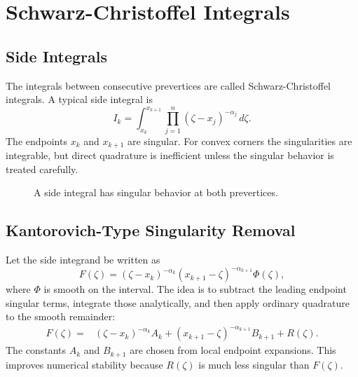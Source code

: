 \documentclass[12pt,a4paper]{article}
\begin{document}
\section{Schwarz-Christoffel Integrals}

\subsection{Side Integrals}

The integrals between consecutive prevertices are called Schwarz-Christoffel integrals. A typical side integral is
\[
I_k=\int_{x_k}^{x_{k+1}}\prod_{j=1}^{n}(\zeta-x_j)^{-\alpha_j}\,d\zeta.
\]
The endpoints \(x_k\) and \(x_{k+1}\) are singular. For convex corners the singularities are integrable, but direct quadrature is inefficient unless the singular behavior is treated carefully.

\begin{figure}[H]
\centering
{}
\caption{A side integral has singular behavior at both prevertices.}
\end{figure}

\subsection{Kantorovich-Type Singularity Removal}

Let the side integrand be written as
\[
F(\zeta)=(\zeta-x_k)^{-\alpha_k}(x_{k+1}-\zeta)^{-\alpha_{k+1}}\Phi(\zeta),
\]
where \(\Phi\) is smooth on the interval. The idea is to subtract the leading endpoint singular terms, integrate those analytically, and then apply ordinary quadrature to the smooth remainder:
\begin{align*}
F(\zeta)={}&(\zeta-x_k)^{-\alpha_k}A_k
+(x_{k+1}-\zeta)^{-\alpha_{k+1}}B_{k+1}
+R(\zeta).
\end{align*}
The constants \(A_k\) and \(B_{k+1}\) are chosen from local endpoint expansions. This improves numerical stability because \(R(\zeta)\) is much less singular than \(F(\zeta)\).
\end{document}
